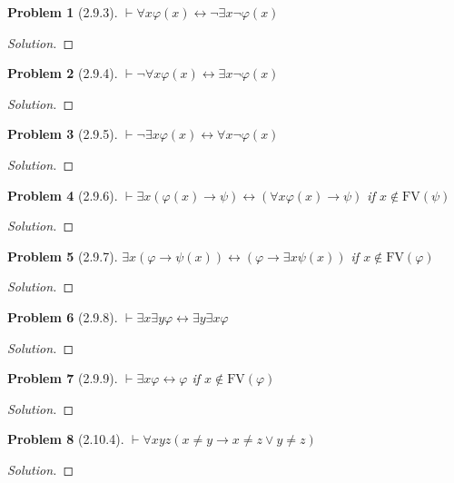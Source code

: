 \documentclass[letter]{article}
\newtheorem{problem}{Problem}
\theoremstyle{definition}
\newenvironment{solution}
{\begin{proof}[Solution]}
        {\end{proof}}
\renewcommand{\phi}{\varphi}
\begin{document}
\begin{problem}[2.9.3]
    $\vdash \forall x \phi(x) \leftrightarrow \neg \exists x \neg \phi(x)$
\end{problem}
\begin{solution}
\end{solution}

\begin{problem}[2.9.4]
    $\vdash \neg \forall x \phi(x) \leftrightarrow \exists x \neg \phi(x)$
\end{problem}
\begin{solution}
\end{solution}

\begin{problem}[2.9.5]
    $\vdash \neg \exists x \phi(x) \leftrightarrow \forall x \neg \phi(x)$
\end{problem}
\begin{solution}
\end{solution}

\begin{problem}[2.9.6]
    $\vdash \exists x (\phi(x) \to \psi) \leftrightarrow (\forall x \phi(x) \to \psi)$ if $x \notin \textrm{FV}(\psi)$
\end{problem}
\begin{solution}
\end{solution}

\begin{problem}[2.9.7]
    $\exists x(\phi \to \psi(x)) \leftrightarrow(\phi \to \exists x \psi(x))$ if $x \notin \textrm{FV}(\phi)$
\end{problem}
\begin{solution}
\end{solution}

\begin{problem}[2.9.8]
    $\vdash \exists x \exists y \phi \leftrightarrow \exists y \exists x \phi$
\end{problem}
\begin{solution}
\end{solution}

\begin{problem}[2.9.9]
    $\vdash \exists x \phi \leftrightarrow \phi$ if $x \notin \textrm{FV}(\phi)$
\end{problem}
\begin{solution}
\end{solution}

\begin{problem}[2.10.4]
    $\vdash \forall x y z (x \neq y \to x \neq z \lor y \neq z)$
\end{problem}
\begin{solution}
\end{solution}
\end{document}
